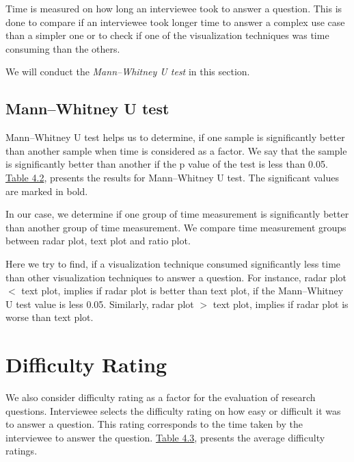 Time is measured on how long an interviewee took to answer a question. This is done to compare if an interviewee took longer time to answer a complex use case than a simpler one or to check if one of the visualization techniques was time consuming than the others.

We will conduct the \textit{Mann–Whitney U test} in this section.

\subsection{Mann–Whitney U test}
Mann–Whitney U test helps us to determine, if one sample is significantly better than another sample when time is considered as a factor. We say that the sample is significantly better than another if the p value of the test is less than 0.05. \hyperref[table:time]{Table 4.2}, presents the results for Mann–Whitney U test. The significant values are marked in bold.

In our case, we determine if one group of time measurement is significantly better than another group of time measurement. We compare time measurement groups between radar plot, text plot and ratio plot. 

Here we try to find, if a visualization technique consumed significantly less time than other visualization techniques to answer a question. For instance, radar plot $<$ text plot, implies if radar plot is better than text plot, if the Mann–Whitney U test value is less 0.05. Similarly, radar plot $>$ text plot, implies if radar plot is worse than text plot. 

\section{Difficulty Rating}
\label{sec:4.3}

We also consider difficulty rating as a factor for the evaluation of research questions. Interviewee selects the difficulty rating on how easy or difficult it was to answer a question. This rating corresponds to the time taken by the interviewee to answer the question. \hyperref[table:rating]{Table 4.3}, presents the average difficulty ratings.


